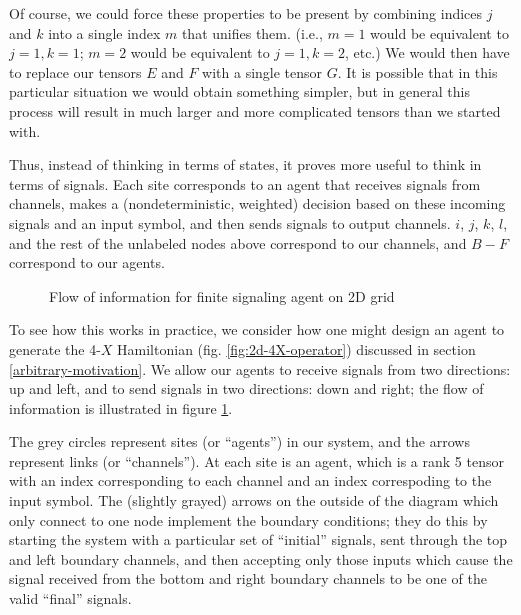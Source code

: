\documentclass{amsbook}
\theoremstyle{plain}
\theoremstyle{definition}
\theoremstyle{remark}
\begin{document}
Of course, we could force these properties to be present by combining indices $j$ and $k$ into a single index $m$ that unifies them.  (i.e., $m=1$ would be equivalent to $j=1, k=1$;  $m=2$ would be equivalent to $j=1,k=2$, etc.)  We would then have to replace our tensors $E$ and $F$ with a single tensor $G$.  It is possible that in this particular situation we would obtain something simpler, but in general this process will result in much larger and more complicated tensors than we started with.

Thus, instead of thinking in terms of states, it proves more useful to think in terms of signals.  Each site corresponds to an agent that receives signals from channels, makes a (nondeterministic, weighted) decision based on these incoming signals and an input symbol, and then sends signals to output channels.  $i$, $j$, $k$, $l$, and the rest of the unlabeled nodes above correspond to our channels, and $B-F$ correspond to our agents.


\begin{figure}
\caption{Flow of information for finite signaling agent on 2D grid}
\label{fig:2d-information-flow}
\end{figure}

To see how this works in practice, we consider how one might design an agent to generate the 4-$X$ Hamiltonian (fig. \ref{fig:2d-4X-operator}) discussed in section \ref{arbitrary-motivation}.  We allow our agents to receive signals from two directions: up and left, and to send signals in two directions:  down and right;  the flow of information is illustrated in figure \ref{fig:2d-information-flow}.

The grey circles represent sites (or ``agents'') in our system, and the arrows represent links (or ``channels'').  At each site is an agent, which is a rank 5 tensor with an index corresponding to each channel and an index correspoding to the input symbol.  The (slightly grayed) arrows on the outside of the diagram which only connect to one node implement the boundary conditions;  they do this by starting the system with a particular set of ``initial'' signals, sent through the top and left boundary channels, and then accepting only those inputs which cause the signal received from the bottom and right boundary channels to be one of the valid ``final'' signals.
\end{document}
